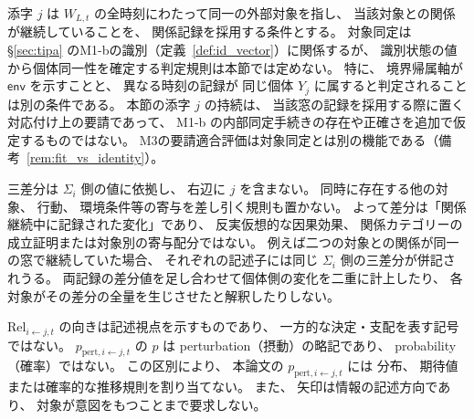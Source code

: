 \begin{remark}[対象添字の時間的持続と差分の非因果性]
\label{rem:object_index_persistence}
添字 $j$ は $W_{L,t}$ の全時刻にわたって同一の外部対象を指し、
当該対象との関係が継続していることを、
関係記録を採用する条件とする。
対象同定は \S\ref{sec:tipa} のM1-bの識別（定義~\ref{def:id_vector}）に関係するが、
識別状態の値から個体同一性を確定する判定規則は本節では定めない。
特に、
境界帰属軸が $\mathsf{env}$ を示すことと、
異なる時刻の記録が
同じ個体 $Y_j$ に属すると判定されることは別の条件である。
本節の添字 $j$ の持続は、
当該窓の記録を採用する際に置く対応付け上の要請であって、
M1-b の内部同定手続きの存在や正確さを追加で仮定するものではない。
M3の要請適合評価は対象同定とは別の機能である（備考~\ref{rem:fit_vs_identity}）。

三差分は $\Sigma_i$ 側の値に依拠し、
右辺に $j$ を含まない。
同時に存在する他の対象、
行動、
環境条件等の寄与を差し引く規則も置かない。
よって差分は「関係継続中に記録された変化」であり、
反実仮想的な因果効果、
関係カテゴリーの成立証明または対象別の寄与配分ではない。
例えば二つの対象との関係が同一の窓で継続していた場合、
それぞれの記述子には同じ $\Sigma_i$ 側の三差分が併記されうる。
両記録の差分値を足し合わせて個体側の変化を二重に計上したり、
各対象がその差分の全量を生じさせたと解釈したりしない。
\end{remark}

\begin{remark}[記号上の注意]
\label{rem:rel_unidirect_notation}
$\mathrm{Rel}_{i\leftarrow j,t}$ の向きは記述視点を示すものであり、
一方的な決定・支配を表す記号ではない。
$p_{\mathrm{pert},i\leftarrow j,t}$ の $p$ は perturbation（摂動）の略記であり、
probability（確率）ではない。
この区別により、
本論文の $p_{\mathrm{pert},i\leftarrow j,t}$ には
分布、
期待値または確率的な推移規則を割り当てない。
また、
矢印は情報の記述方向であり、
対象が意図をもつことまで要求しない。
\end{remark}

